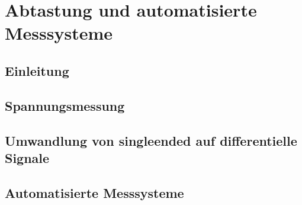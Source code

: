 \chapter{Abtastung und automatisierte Messsysteme}
\section{Einleitung}

\section{Spannungsmessung}

\section{Umwandlung von singleended auf differentielle Signale}

\section{Automatisierte Messsysteme}